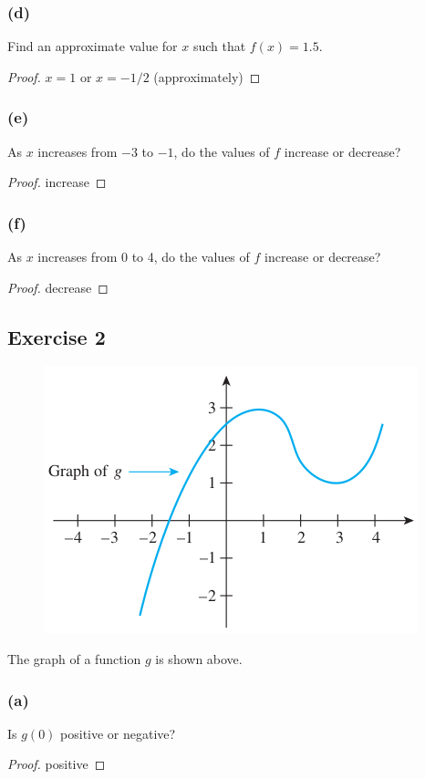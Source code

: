 \documentclass[14pt]{extarticle}
\begin{document}
\subsubsection{(d)}
Find an approximate value for \(x\) such that \(f(x) = 1.5\).
\begin{proof}
    \(x = 1\) or \(x = -1/2\) (approximately)
\end{proof}

\subsubsection{(e)}
As \(x\) increases from \(-3\) to \(-1\), do the values of \(f\) increase or decrease?

\begin{proof}
    increase
\end{proof}

\subsubsection{(f)}
As \(x\) increases from 0 to 4, do the values of \(f\) increase or decrease?

\begin{proof}
    decrease
\end{proof}

\subsection{Exercise 2}
\begin{figure}[ht!]
    \centering
    \includegraphics[scale=0.5]{../images/11.1.2.png}
\end{figure}

The graph of a function \(g\) is shown above.

\subsubsection{(a)}
Is \(g(0)\) positive or negative?
\begin{proof}
    positive
\end{proof}
\end{document}
